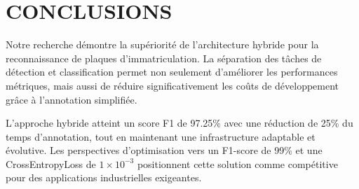 \documentclass[letterpaper, 10 pt, conference]{ieeeconf}  %
\begin{document}
\section{CONCLUSIONS}

Notre recherche démontre la supériorité de l'architecture hybride pour la reconnaissance de plaques d'immatriculation. La séparation des tâches de détection et classification permet non seulement d'améliorer les performances métriques, mais aussi de réduire significativement les coûts de développement grâce à l'annotation simplifiée.

L'approche hybride atteint un score F1 de 97.25\% avec une réduction de 25\% du temps d'annotation, tout en maintenant une infrastructure adaptable et évolutive. Les perspectives d'optimisation vers un F1-score de 99\% et une CrossEntropyLoss de $1 \times 10^{-3}$ positionnent cette solution comme compétitive pour des applications industrielles exigeantes.

\addtolength{\textheight}{-12cm}   %

\end{document}
